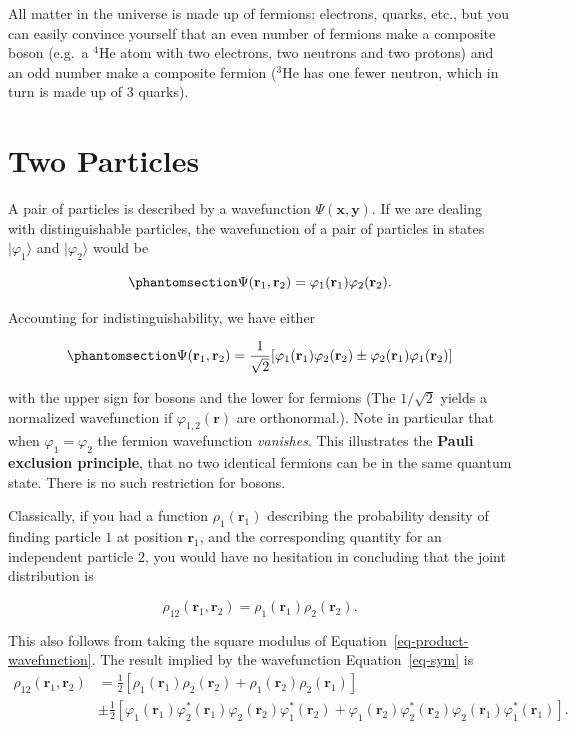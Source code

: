 \documentclass[
  letterpaper,
  DIV=11,
  numbers=noendperiod]{scrreprt}
\begin{document}
All matter in the universe is made up of fermions: electrons, quarks,
etc., but you can easily convince yourself that an even number of
fermions make a composite boson (e.g.~a \(^4\)He atom with two
electrons, two neutrons and two protons) and an odd number make a
composite fermion (\(^3\)He has one fewer neutron, which in turn is made
up of 3 quarks).

\section{Two Particles}\label{two-particles}

A pair of particles is described by a wavefunction
\(\Psi(\mathbf{x},\mathbf{y})\). If we are dealing with distinguishable
particles, the wavefunction of a pair of particles in states
\(\lvert{\varphi_1}\rangle\) and \(\lvert{\varphi_2}\rangle\) would be

\begin{equation}\phantomsection\label{eq-product-wavefunction}{
\Psi(\mathbf{r}_1,\mathbf{r}_2)=\varphi_1(\mathbf{r}_1)\varphi_2(\mathbf{r}_2).
}\end{equation}

Accounting for indistinguishability, we have either

\begin{equation}\phantomsection\label{eq-sym}{
\Psi(\mathbf{r}_1,\mathbf{r}_2)=\frac{1}{\sqrt{2}}[\varphi_1(\mathbf{r}_1)\varphi_2(\mathbf{r}_2)\pm \varphi_2(\mathbf{r}_1)\varphi_1(\mathbf{r}_2)]
}\end{equation}

with the upper sign for bosons and the lower for fermions (The
\(1/\sqrt{2}\) yields a normalized wavefunction if
\(\varphi_{1,2}(\mathbf{r})\) are orthonormal.). Note in particular that
when \(\varphi_1=\varphi_2\) the fermion wavefunction \emph{vanishes}.
This illustrates the \textbf{Pauli exclusion principle}, that no two
identical fermions can be in the same quantum state. There is no such
restriction for bosons.

Classically, if you had a function \(\rho_{1}(\mathbf{r}_1)\) describing
the probability density of finding particle \(1\) at position
\(\mathbf{r}_1\), and the corresponding quantity for an independent
particle \(2\), you would have no hesitation in concluding that the
joint distribution is

\[
\rho_{12}(\mathbf{r}_1,\mathbf{r}_2)=\rho_1(\mathbf{r}_1)\rho_2(\mathbf{r}_2).
\label{eq:classicaljoint}
\]

This also follows from taking the square modulus of
Equation~\ref{eq-product-wavefunction}. The result implied by the
wavefunction Equation~\ref{eq-sym} is \[
\begin{align}
\rho_{12}(\mathbf{r}_1,\mathbf{r}_2) &= \frac{1}{2}\left[\rho_1(\mathbf{r}_1)\rho_2(\mathbf{r}_2)+\rho_1(\mathbf{r}_2)\rho_2(\mathbf{r}_1)\right] \\
&\pm\frac{1}{2}\left[\varphi^{}_1(\mathbf{r}_1)\varphi^*_2(\mathbf{r}_1)\varphi^{}_2(\mathbf{r}_2)\varphi^*_1(\mathbf{r}_2)+\varphi^{}_1(\mathbf{r}_2)\varphi^*_2(\mathbf{r}_2)\varphi^{}_2(\mathbf{r}_1)\varphi^*_1(\mathbf{r}_1)\right].
\end{align}
\]
\end{document}
